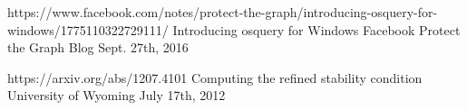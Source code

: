 


\begin{cventries}


\cventry
{https://www.facebook.com/notes/protect-the-graph/introducing-osquery-for-windows/1775110322729111/} %
{Introducing osquery for Windows} %
{Facebook Protect the Graph Blog} %
{Sept. 27th, 2016} %
{ %
\begin{cvitems}
\end{cvitems}
}


\cventry
{https://arxiv.org/abs/1207.4101} %
{Computing the refined stability condition} %
{University of Wyoming} %
{July 17th, 2012} %
{ %
\begin{cvitems}
\end{cvitems}
}


\end{cventries}